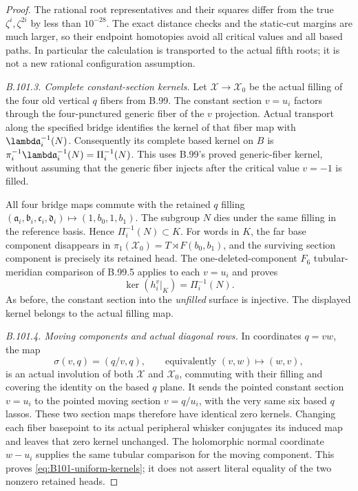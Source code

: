 \begin{proof}
The rational root representatives and their squares differ from the
true $\zeta^i,\zeta^{2i}$ by less than $10^{-28}$.
The exact distance checks and the static-cut margins are much larger,
so their endpoint homotopies avoid all critical values and all
based paths.  In particular the calculation is transported to the
actual fifth roots; it is not a new rational configuration assumption.

\emph{B.101.3. Complete constant-section kernels.}
Let $\mathscr X\to\mathscr X_0$ be the actual filling of the four
old vertical $q$ fibers from B.99.
The constant section $v=u_i$ factors through the four-punctured
generic fiber of the $v$ projection.  Actual transport along the
specified bridge identifies the kernel of that fiber map with
$\lambd\mathfrak{a}_i^{-1}(N)$.
Consequently its complete based kernel on $B$ is
$\pi_i^{-1}\lambd\mathfrak{a}_i^{-1}(N)=\Pi_i^{-1}(N)$.
This uses B.99's proved generic-fiber kernel, without assuming that
the generic fiber injects after the critical value $v=-1$ is filled.

All four bridge maps commute with the retained $q$ filling
$(\mathfrak{a}_i,\mathfrak{b}_i,\mathfrak{c}_i,\mathfrak{d}_i)\mapsto(1,b_0,1,b_1)$.
The subgroup $N$ dies under the same filling in the reference basis.
Hence $\Pi_i^{-1}(N)\subset K$.
For words in $K$, the far base component disappears in
$\pi_1(\mathscr X_0)=T\rtimes F(b_0,b_1)$, and the surviving
section component is precisely its retained head.
The one-deleted-component $F_6$ tubular-meridian comparison of
B.99.5 applies to each $v=u_i$ and proves
\[
 \ker(h_i^v|_K)=\Pi_i^{-1}(N).
\]
As before, the constant section into the \emph{unfilled} surface
is injective.  The displayed kernel belongs to the actual filling map.

\emph{B.101.4. Moving components and actual diagonal rows.}
In coordinates $q=vw$, the map
\begin{equation}\label{eq:B101-swap}
 \sigma(v,q)=(q/v,q),\qquad\text{equivalently }(v,w)\mapsto(w,v),
\end{equation}
is an actual involution of both $\mathscr X$ and $\mathscr X_0$,
commuting with their filling and covering the identity on the based
$q$ plane.  It sends the pointed constant section $v=u_i$ to the
pointed moving section $v=q/u_i$, with the very same six based $q$ lassos.
These two section maps therefore have identical zero kernels.
Changing each fiber basepoint to its actual peripheral whisker
conjugates its induced map and leaves that zero kernel unchanged.
The holomorphic normal coordinate $w-u_i$ supplies the same tubular
comparison for the moving component.
This proves \eqref{eq:B101-uniform-kernels}; it does not assert
literal equality of the two nonzero retained heads.


\end{proof}
